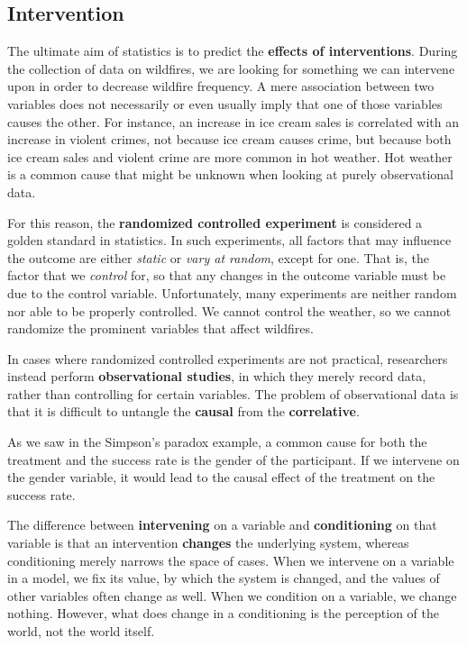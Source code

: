 \documentclass{article}
\begin{document}
\subsection{Intervention}

The ultimate aim of statistics is to predict the \textbf{effects of interventions}. During the collection of data on wildfires, we are looking for something we can intervene upon in order to decrease wildfire frequency. A mere association between two variables does not necessarily or even usually imply that one of those variables causes the other. For instance, an increase in ice cream sales is correlated with an increase in violent crimes, not because ice cream causes crime, but because both ice cream sales and violent crime are more common in hot weather. Hot weather is a common cause that might be unknown when looking at purely observational data. 

For this reason, the \textbf{randomized controlled experiment} is considered a golden standard in statistics. In such experiments, all factors that may influence the outcome are either \textit{static} or \textit{vary at random}, except for one. That is, the factor that we \textit{control} for, so that any changes in the outcome variable must be due to the control variable. Unfortunately, many experiments are neither random nor able to be properly controlled. We cannot control the weather, so we cannot randomize the prominent variables that affect wildfires. 

In cases where randomized controlled experiments are not practical, researchers instead perform \textbf{observational studies}, in which they merely record data, rather than controlling for certain variables. The problem of observational data is that it is difficult to untangle the \textbf{causal} from the \textbf{correlative}. 

As we saw in the Simpson's paradox example, a common cause for both the treatment and the success rate is the gender of the participant. If we intervene on the gender variable, it would lead to the causal effect of the treatment on the success rate. 

The difference between \textbf{intervening} on a variable and \textbf{conditioning} on that variable is that an intervention \textbf{changes} the underlying system, whereas conditioning merely narrows the space of cases. When we intervene on a variable in a model, we fix its value, by which the system is changed, and the values of other variables often change as well. When we condition on a variable, we change nothing. However, what does change in a conditioning is the perception of the world, not the world itself. 
\end{document}
